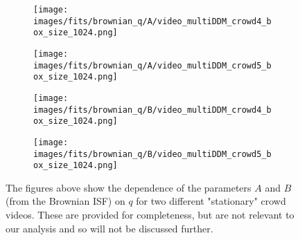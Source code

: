 \documentclass[10pt]{article}
\begin{document}
\begin{figure}[H]
\begin{subfigure}[t]{.5\textwidth}
  \centering
  \texttt{[image: images/fits/brownian\_q/A/video\_multiDDM\_crowd4\_box\_size\_1024.png]}
  \caption{}
\end{subfigure}%
\hfill
\begin{subfigure}[t]{.5\textwidth}
  \centering
  \texttt{[image: images/fits/brownian\_q/A/video\_multiDDM\_crowd5\_box\_size\_1024.png]}
  \caption{}
\end{subfigure}
\label{fig:crowd_brownian_fits_A}
\par\bigskip
\begin{subfigure}[t]{.5\textwidth}
  \centering
  \texttt{[image: images/fits/brownian\_q/B/video\_multiDDM\_crowd4\_box\_size\_1024.png]}
  \caption{}
\end{subfigure}%
\hfill
\begin{subfigure}[t]{.5\textwidth}
  \centering
  \texttt{[image: images/fits/brownian\_q/B/video\_multiDDM\_crowd5\_box\_size\_1024.png]}
  \caption{}
\end{subfigure}
\caption{The figures above show the dependence of the parameters $A$ and $B$ (from the Brownian ISF) on $q$ for two different "stationary" crowd videos. These are provided for completeness, but are not relevant to our analysis and so will not be discussed further.}
\label{fig:crowd_brownian_fits_B}
\end{figure}
\end{document}
